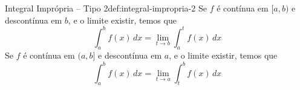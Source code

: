 \begin{definicao}{Integral Imprópria -- Tipo 2}{def:integral-impropria-2}
  Se $f$ é contínua em $[a, b)$ e descontínua em $b$, e o limite existir,
  temos que
  \[
    \int_a^b f(x)\,dx = \lim_{t\to b} \int_a^t f(x)\,dx
  \]
  Se $f$ é contínua em $(a, b]$ e descontínua em $a$, e o limite existir,
  temos que
  \[
    \int_a^b f(x)\,dx = \lim_{t\to a} \int_t^b f(x)\,dx
  \]
\end{definicao}




